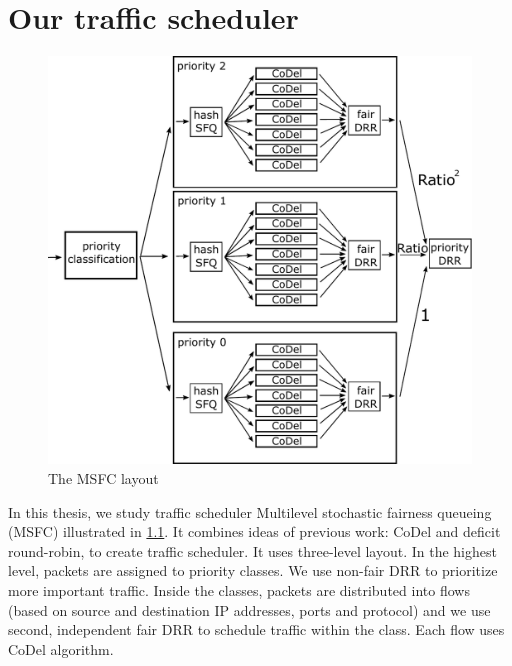 \chapter{Our traffic scheduler}
\label{chap02}


\begin{figure}
	\centering
	\includegraphics[width=137mm]{drawings/msfc}
	\caption{The MSFC layout}
	\label{fig10:msfc}
\end{figure}

In this thesis, we study traffic scheduler Multilevel stochastic fairness queueing (MSFC) illustrated in \ref{fig10:msfc}. It combines ideas of previous work: CoDel and deficit round-robin, to create traffic scheduler. It uses three-level layout. In the highest level, packets are assigned to priority classes. We use non-fair DRR to prioritize more important traffic. Inside the classes, packets are distributed into flows (based on source and destination IP addresses, ports and protocol) and we use second, independent fair DRR to schedule traffic within the class. Each flow uses CoDel algorithm.


